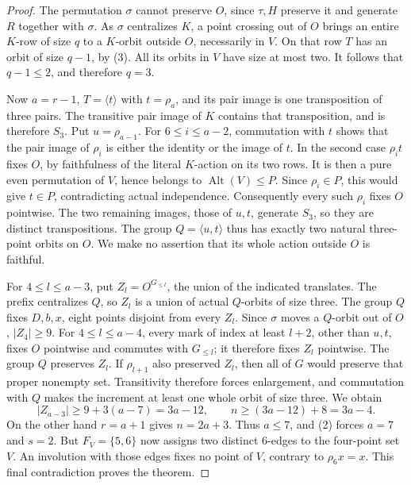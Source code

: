 \documentclass[11pt,a4paper]{article}
\newcommand{\gen}[1]{\langle#1\rangle}
\newcommand{\Alt}{\operatorname{Alt}}
\begin{document}
\begin{proof}
The permutation $\sigma$ cannot preserve $O$, since
$\tau,H$ preserve it and generate $R$ together with
$\sigma$. As $\sigma$ centralizes $K$, a point
crossing out of $O$ brings an entire $K$-row of size
$q$ to a $K$-orbit outside $O$, necessarily in $V$.
On that row $T$ has an orbit of size $q-1$, by (3).
All its orbits in $V$ have size at most two.
It follows that $q-1\le2$, and therefore $q=3$.

Now $a=r-1$, $T=\gen t$ with $t=\rho_a$, and its
pair image is one transposition of three pairs.
The transitive pair image of $K$ contains that
transposition, and is therefore $S_3$. Put
$u=\rho_{a-1}$. For $6\le i\le a-2$, commutation
with $t$ shows that the pair image of $\rho_i$ is
either the identity or the image of $t$. In the
second case $\rho_i t$ fixes $O$, by faithfulness
of the literal $K$-action on its two rows. It is
then a pure even permutation of $V$, hence belongs
to $\Alt(V)\le P$. Since $\rho_i\in P$, this would
give $t\in P$, contradicting actual independence.
Consequently every such $\rho_i$ fixes $O$ pointwise.
The two remaining images, those of $u,t$, generate
$S_3$, so they are distinct transpositions.
The group $Q=\gen{u,t}$ thus has exactly two natural
three-point orbits on $O$. We make no assertion
that its whole action outside $O$ is faithful.

For $4\le l\le a-3$, put $Z_l=O^{G_{\le l}}$, the
union of the indicated translates. The prefix
centralizes $Q$, so $Z_l$ is a union of actual
$Q$-orbits of size three. The group $Q$ fixes
$D,b,x$, eight points disjoint from every $Z_l$.
Since $\sigma$ moves a $Q$-orbit out of $O$,
$|Z_4|\ge9$.
For $4\le l\le a-4$, every mark of index at least
$l+2$, other than $u,t$, fixes $O$ pointwise and
commutes with $G_{\le l}$; it therefore fixes $Z_l$
pointwise. The group $Q$ preserves $Z_l$.
If $\rho_{l+1}$ also preserved $Z_l$, then all of
$G$ would preserve that proper nonempty set.
Transitivity therefore forces enlargement, and
commutation with $Q$ makes the increment at least
one whole orbit of size three. We obtain
\[
 |Z_{a-3}|\ge9+3(a-7)=3a-12,\qquad
 n\ge(3a-12)+8=3a-4.                                  \tag{4}
\]
On the other hand $r=a+1$ gives $n=2a+3$.
Thus $a\le7$, and (2) forces $a=7$ and $s=2$.
But $F_V=\{5,6\}$ now assigns two distinct
$6$-edges to the four-point set $V$. An involution
with those edges fixes no point of $V$, contrary
to $\rho_6x=x$. This final contradiction proves
the theorem.
\end{proof}
\end{document}
